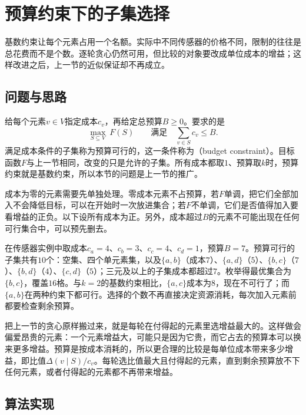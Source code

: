 
\section{预算约束下的子集选择}
\label{sec:graph-budget-selection}

基数约束让每个元素占用一个名额。实际中不同传感器的价格不同，限制的往往是总花费而不是个数。逐轮贪心仍然可用，但比较的对象要改成单位成本的增益；这样改进之后，上一节的近似保证却不再成立。

\subsection{问题与思路}
\label{sec:graph-setfn-budget-problem}

给每个元素$v\in V$指定成本$c_v$，再给定总预算$B\geq0$。要求的是
\begin{equation}
  \max_{S\subseteq V}\ F(S)\qquad\text{满足}\quad\sum_{v\in S}c_v\leq B.
  \label{eq:graph-setfn-budget-problem}
\end{equation}
满足成本条件的子集称为预算可行的，这一条件称为（budget constraint）。目标函数$F$与上一节相同，改变的只是允许的子集。所有成本都取$1$、预算取$k$时，预算约束就是基数约束，所以本节的问题是上一节的推广。

成本为零的元素需要先单独处理。零成本元素不占预算，若$F$单调，把它们全部加入不会降低目标，可以在开始时一次放进集合；若$F$不单调，它们是否值得加入要看增益的正负。以下设所有成本为正。另外，成本超过$B$的元素不可能出现在任何可行集合中，可以预先删去。

在传感器实例中取成本$c_a=4$、$c_b=3$、$c_c=4$、$c_d=1$，预算$B=7$。预算可行的子集共有$10$个：空集、四个单元素集，以及$\{a,b\}$（成本$7$）、$\{a,d\}$（$5$）、$\{b,c\}$（$7$）、$\{b,d\}$（$4$）、$\{c,d\}$（$5$）；三元及以上的子集成本都超过$7$。枚举得最优集合为$\{b,c\}$，覆盖$16$格。与$k=2$的基数约束相比，$\{a,c\}$成本为$8$，现在不可行了；而$\{a,b\}$在两种约束下都可行。选择的个数不再直接决定资源消耗，每次加入元素前都要检查剩余预算。

把上一节的贪心原样搬过来，就是每轮在付得起的元素里选增益最大的。这样做会偏爱昂贵的元素：一个元素增益大，可能只是因为它贵，而它占去的预算本可以换来更多增益。预算是按成本消耗的，所以更合理的比较是每单位成本带来多少增益，即比值$\Delta(v\mid S)/c_v$。每轮选比值最大且付得起的元素，直到剩余预算放不下任何元素，或者付得起的元素都不再带来增益。

\subsection{算法实现}
\label{sec:graph-setfn-ratio-greedy}

